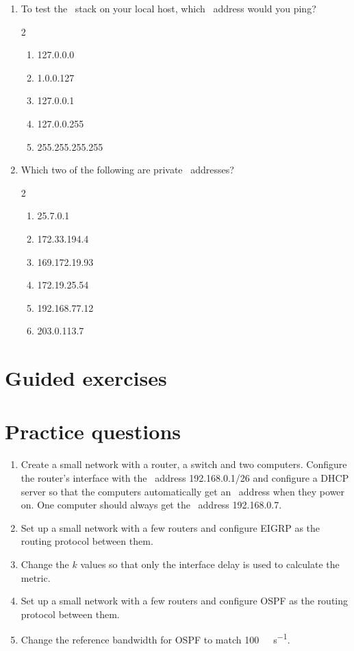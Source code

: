 \begin{enumerate}
\begin{multicols}{2}
\begin{enumerate}
   \end{enumerate}
   \end{multicols}
\item
   To test the \IP\ stack on your local host, which \IP\ address would you ping?
   \begin{multicols}{2}
   \raggedcolumns
   \begin{enumerate}
   \item 127.0.0.0
   \item 1.0.0.127
   \item 127.0.0.1
   \item 127.0.0.255
   \item 255.255.255.255
   \end{enumerate}
   \end{multicols}
\item
   Which two of the following are private \IP\ addresses?
   \begin{multicols}{2}
   \begin{enumerate}
   \item 25.7.0.1
   \item 172.33.194.4
   \item 169.172.19.93
   \item 172.19.25.54
   \item 192.168.77.12
   \item 203.0.113.7
   \end{enumerate}
\end{multicols}
\end{enumerate}

\section{Guided exercises}
\label{sec:ip-guided-exercises}

\section{Practice questions}
\label{sec:ip-practice-questions}
\begin{enumerate}
\item
   Create a small network with a router, a switch and two computers.
   Configure the router's interface with the \IP\ address 192.168.0.1/26 and configure a \acs{DHCP} server so that the computers automatically get an \IP\ address when they power on.
   One computer should always get the \IP\ address 192.168.0.7.
\item
   Set up a small network with a few routers and configure \acs{EIGRP} as the routing protocol between them.
\item
   Change the $k$ values so that only the interface delay is used to calculate the metric.
\item
   Set up a small network with a few routers and configure \acs{OSPF} as the routing protocol between them.
\item   
\label{ex:ip-ospf-ref-bw}
   Change the reference bandwidth for \acs{OSPF} to match \SI{100}{\giga\bit\per\second}.
\end{enumerate}




